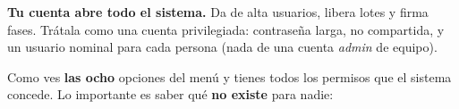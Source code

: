 

\tablaAcceso

\vspace{8pt}

\reglasAcceso



\begin{cajaOjo}
\textbf{Tu cuenta abre todo el sistema.} Da de alta usuarios, libera lotes y firma
fases. Trátala como una cuenta privilegiada: contraseña larga, no compartida, y un
usuario nominal para cada persona (nada de una cuenta \textit{admin} de equipo).
\end{cajaOjo}

\avisoValidacion

\newpage
{}

Como \manualRol{} ves \textbf{las ocho} opciones del menú y tienes todos los permisos
que el sistema concede. Lo importante es saber qué \textbf{no existe} para nadie:


